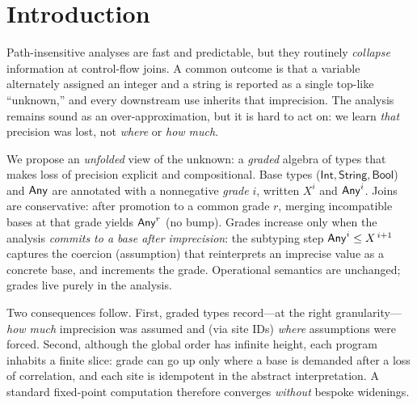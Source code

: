 \section{Introduction}

Path-insensitive analyses are fast and predictable, but they routinely \emph{collapse} information at control-flow joins.
A common outcome is that a variable alternately assigned an integer and a string is reported as a single top-like ``unknown,'' and every downstream use inherits that imprecision.
The analysis remains sound as an over-approximation, but it is hard to act on: we learn \emph{that} precision was lost, not \emph{where} or \emph{how much}.

We propose an \emph{unfolded} view of the unknown: a \emph{graded} algebra of types that makes loss of precision explicit and compositional.
Base types (\(\mathsf{Int},\mathsf{String},\mathsf{Bool}\)) and \(\mathsf{Any}\) are annotated with a nonnegative \emph{grade} \(i\), written \(X^{i}\) and \(\mathsf{Any}^{i}\).
Joins are conservative: after promotion to a common grade \(r\), merging incompatible bases at that grade yields \(\mathsf{Any}^{r}\) (no bump).
Grades increase only when the analysis \emph{commits to a base after imprecision}:
the subtyping step \(\mathsf{Any}^{i} \le X^{\,i+1}\) captures the coercion (assumption) that reinterprets an imprecise value as a concrete base, and increments the grade.
Operational semantics are unchanged; grades live purely in the analysis.

Two consequences follow.
First, graded types record—at the right granularity—\emph{how much} imprecision was assumed and (via site IDs) \emph{where} assumptions were forced.
Second, although the global order has infinite height, each program inhabits a finite slice:
grade can go up only where a base is demanded after a loss of correlation, and each site is idempotent in the abstract interpretation.
A standard fixed-point computation therefore converges \emph{without} bespoke widenings.

